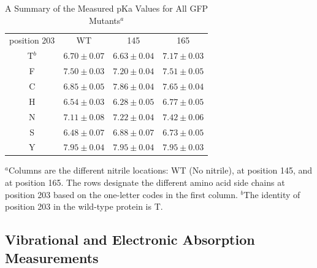 \begin{table}
    \begin{center}
    \caption{A Summary of the Measured pKa Values for All GFP Mutants$^a$}
    \begin{tabular}{c|ccc}
        \toprule
        \rowcolor{lgray}
        position 203 & WT & \pCNF{} 145 & \pCNF{} 165 \\

        \cmidrule(r){1-1}\cmidrule(l){2-4}
        T$^b$ &   $ 6.70 \pm 0.07 $  &  $ 6.63 \pm 0.04 $ &  $ 7.17 \pm 0.03 $  \\
        F     &   $ 7.50 \pm 0.03 $  &  $ 7.20 \pm 0.04 $ &  $ 7.51 \pm 0.05 $  \\
        C     &   $ 6.85 \pm 0.05 $  &  $ 7.86 \pm 0.04 $ &  $ 7.65 \pm 0.04 $  \\
        H     &   $ 6.54 \pm 0.03 $  &  $ 6.28 \pm 0.05 $ &  $ 6.77 \pm 0.05 $  \\ 
        N     &   $ 7.11 \pm 0.08 $  &  $ 7.22 \pm 0.04 $ &  $ 7.42 \pm 0.06 $  \\ 
        S     &   $ 6.48 \pm 0.07 $  &  $ 6.88 \pm 0.07 $ &  $ 6.73 \pm 0.05 $  \\ 
        Y     &   $ 7.95 \pm 0.04 $  &  $ 7.95 \pm 0.04 $ &  $ 7.95 \pm 0.03 $  \\ 

        \bottomrule
    \end{tabular}
    \end{center}

    $^a$Columns are the different nitrile locations: WT (No nitrile), \pCNF{} at position 145, and \pCNF{} at position 165. The rows designate the different amino acid side chains at position 203 based on the one-letter codes in the first column. 
    $^b$The identity of position 203 in the wild-type protein is T.
    \label{tbl:pKas}
\end{table}

\subsection{Vibrational and Electronic Absorption Measurements}

